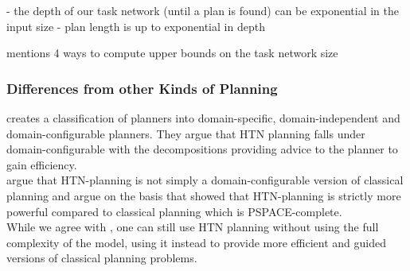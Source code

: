 
\begin{comment}
\cite{erol1994htn}
- complexity depends on
	1. existence/ ordering of non-primitive tasks in task networks
	2. total order (or not) of tasks
	3. whether variables are allowed
- general HTN planning (non-primitive tasks are allowed, no guaranteed total order, variables are allowed) -> undecidable
- TOHTN planning (variables allowed, arbitrary non-primitive tasks) -> D-EXPTIME, EXPSPACE-hard
 
- context free grammars play a role, can be simulated in HTN

\cite{erol1996complexity}
- undecidable for HTN, D-EXPTIME and PSPACE-hard for TOHTN

both: context-free grammars can be simulated by HTN, use primitive tasks as terminals, abstract tasks as non-terminals, methods as grammar rules

\cite{holler2014language}
- TOHTN planning problems correspond to context free grammars

\cite{behnke2015complexity}
- HTN plan verification is NP-complete
- this even holds if the list of decompositions is provided
\end{comment}

- the depth of our task network (until a plan is found) can be exponential in the input size
- plan length is up to exponential in depth

\cite{behnke2019finding} mentions 4 ways to compute upper bounds on the task network size

\subsubsection{Differences from other Kinds of Planning}
\cite{nau2007current} creates a classification of planners into domain-specific, domain-independent and domain-configurable planners.
They argue that HTN planning falls under domain-configurable with the decompositions providing advice to the planner to gain efficiency. \\
\cite{holler2020htn} argue that HTN-planning is not simply a domain-configurable version of classical planning and argue on the basis that \cite{erol1994htn, erol1996complexity} showed that HTN-planning is strictly more powerful compared to classical planning which is PSPACE-complete. \\
While we agree with \cite{holler2020htn}, one can still use HTN planning without using the full complexity of the model, using it instead to provide more efficient and guided versions of classical planning problems.